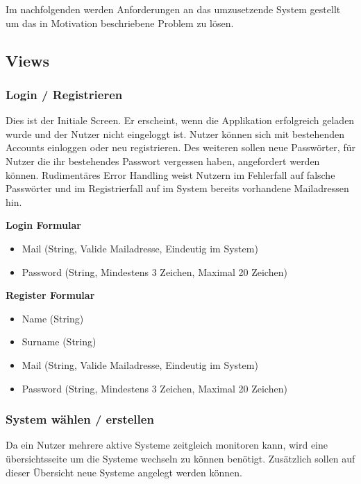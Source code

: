 Im nachfolgenden werden Anforderungen an das umzusetzende System gestellt um das in Motivation beschriebene Problem zu lösen.

\subsection{Views}
\subsubsection{Login / Registrieren}

Dies ist der Initiale Screen.
Er erscheint, wenn die Applikation erfolgreich geladen wurde und der Nutzer nicht eingeloggt ist.
Nutzer können sich mit bestehenden Accounts einloggen oder neu registrieren.
Des weiteren sollen neue Passwörter, für Nutzer die ihr bestehendes Passwort vergessen haben, angefordert werden können.
Rudimentäres Error Handling weist Nutzern im Fehlerfall auf falsche Passwörter und im Registrierfall auf
im System bereits vorhandene Mailadressen hin.

\vspace{1cm}


\textbf{Login Formular}
\begin{itemize}
\item Mail (String, Valide Mailadresse, Eindeutig im System)
\item Password (String, Mindestens 3 Zeichen, Maximal 20 Zeichen)
\end{itemize}

\textbf{Register Formular}
\begin{itemize}
\item Name (String)
\item Surname (String)
\item Mail (String, Valide Mailadresse, Eindeutig im System)
\item Password (String, Mindestens 3 Zeichen, Maximal 20 Zeichen)
\end{itemize}


\vspace{1cm}

\subsubsection{System wählen / erstellen}

Da ein Nutzer mehrere aktive Systeme zeitgleich monitoren kann, wird eine übersichtsseite
um die Systeme wechseln zu können benötigt. Zusätzlich sollen auf dieser Übersicht
neue Systeme angelegt werden können.

